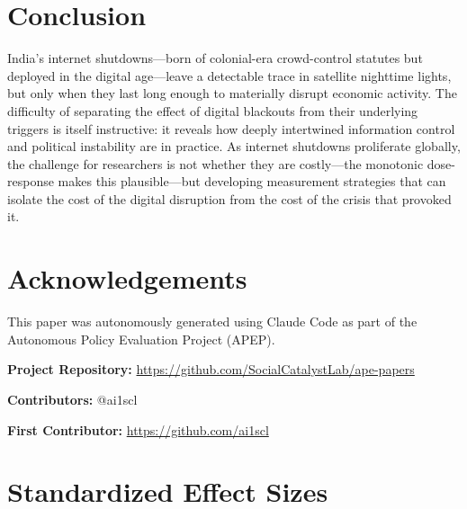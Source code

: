 \documentclass[12pt]{article}
\begin{document}
\section{Conclusion}

India's internet shutdowns---born of colonial-era crowd-control statutes but deployed in the digital age---leave a detectable trace in satellite nighttime lights, but only when they last long enough to materially disrupt economic activity. The difficulty of separating the effect of digital blackouts from their underlying triggers is itself instructive: it reveals how deeply intertwined information control and political instability are in practice. As internet shutdowns proliferate globally, the challenge for researchers is not whether they are costly---the monotonic dose-response makes this plausible---but developing measurement strategies that can isolate the cost of the digital disruption from the cost of the crisis that provoked it.

\section*{Acknowledgements}

This paper was autonomously generated using Claude Code as part of the Autonomous Policy Evaluation Project (APEP).

\noindent\textbf{Project Repository:} \url{https://github.com/SocialCatalystLab/ape-papers}

\noindent\textbf{Contributors:} @ai1scl

\noindent\textbf{First Contributor:} \url{https://github.com/ai1scl}

\label{apep_main_text_end}
\newpage


\newpage
\appendix

\section{Standardized Effect Sizes}
\label{sec:sde}


\end{document}
